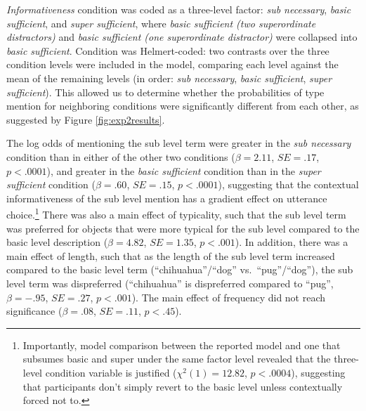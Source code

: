 \documentclass[11pt]{article}
\newcommand{\figref}[1]{Figure \ref{#1}}
\begin{document}
\emph{Informativeness} condition was coded as a three-level factor: \emph{sub necessary}, \emph{basic sufficient}, and \emph{super sufficient}, where \emph{basic sufficient (two superordinate distractors)} and \emph{basic sufficient (one superordinate distractor)} were collapsed into \emph{basic sufficient}. Condition was Helmert-coded: two contrasts over the three condition levels were included in the model, comparing each level against the mean of the remaining levels (in order: \emph{sub necessary}, \emph{basic sufficient}, \emph{super sufficient}). This allowed us to determine whether the probabilities of type mention  for neighboring conditions were significantly different from each other, as suggested by \figref{fig:exp2results}.

%

The log odds of mentioning the sub level term were greater in the \emph{sub necessary} condition than in either of the other two conditions ($\beta = 2.11$, $SE = .17$, $p < .0001$), and greater in the \emph{basic sufficient} condition than in the \emph{super sufficient} condition ($\beta = .60$, $SE = .15$, $p < .0001$), suggesting that the contextual informativeness of the sub level mention has a gradient effect on utterance choice.\footnote{Importantly, model comparison between the reported model and one that subsumes basic and super under the same factor level revealed that the three-level condition variable is justified ($\chi ^2 (1) = 12.82$, $p < .0004$), suggesting that participants don't simply revert to the basic level unless contextually forced not to.} There was also a main effect of typicality, such that the sub level term was preferred for objects that were more typical for the sub level compared to the basic level  description ($\beta = 4.82$, $SE = 1.35$, $p < .001$). In addition, there was a main effect of length, such that as the length of the sub level term increased compared to the basic level term (``chihuahua''/``dog'' vs.~``pug''/``dog''), the sub level term was dispreferred (``chihuahua'' is dispreferred compared to ``pug'', $\beta = -.95$, $SE = .27$, $p < .001$). The main effect of frequency did not reach significance ($\beta = .08$, $SE = .11$, $p < .45$).
\end{document}
